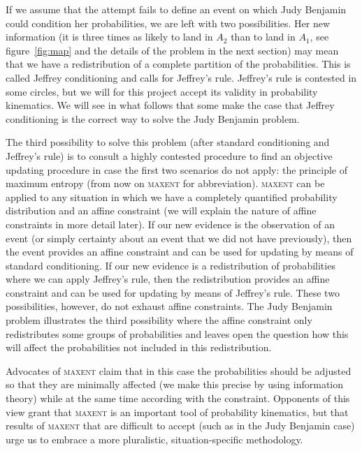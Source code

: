 \documentclass[12pt]{article}
\begin{document}
If we assume that the attempt fails to define an event on which Judy
Benjamin could condition her probabilities, we are left with two
possibilities. Her new information (it is three times as likely to
land in $A_{2}$ than to land in $A_{1}$, see figure~\ref{fig:map} and
the details of the problem in the next section) may mean that we have
a redistribution of a complete partition of the probabilities. This is
called Jeffrey conditioning and calls for Jeffrey's rule. Jeffrey's
rule is contested in some circles, but we will for this project accept
its validity in probability kinematics. We will see in what follows
that some make the case that Jeffrey conditioning is the correct way
to solve the Judy Benjamin problem.

The third possibility to solve this problem (after standard
conditioning and Jeffrey's rule) is to consult a highly contested
procedure to find an objective updating procedure in case the first
two scenarios do not apply: the principle of maximum entropy (from now
on \textsc{maxent} for abbreviation). \textsc{maxent} can be applied
to any situation in which we have a completely quantified probability
distribution and an affine constraint (we will explain the nature of
affine constraints in more detail later). If our new evidence is the
observation of an event (or simply certainty about an event that we
did not have previously), then the event provides an affine constraint
and can be used for updating by means of standard conditioning. If our
new evidence is a redistribution of probabilities where we can apply
Jeffrey's rule, then the redistribution provides an affine constraint
and can be used for updating by means of Jeffrey's rule. These two
possibilities, however, do not exhaust affine constraints. The Judy
Benjamin problem illustrates the third possibility where the affine
constraint only redistributes some groups of probabilities and leaves
open the question how this will affect the probabilities not included
in this redistribution.

Advocates of \textsc{maxent} claim that in this case the probabilities
should be adjusted so that they are minimally affected (we make this
precise by using information theory) while at the same time according
with the constraint. Opponents of this view grant that \textsc{maxent}
is an important tool of probability kinematics, but that results of
\textsc{maxent} that are difficult to accept (such as in the Judy
Benjamin case) urge us to embrace a more pluralistic,
situation-specific methodology.
\end{document}
